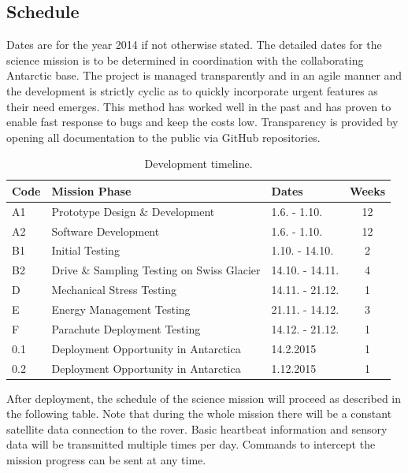 \documentclass[a4paper,12pt]{article}
\begin{document}
\subsection{Schedule}

Dates are for the year 2014 if not otherwise stated. The detailed dates for the science mission is to be determined in coordination with the collaborating Antarctic base. The project is managed transparently and in an agile manner and the development is strictly cyclic as to quickly incorporate urgent features as their need emerges. This method has worked well in the past and has proven to enable fast response to bugs and keep the costs low. Transparency is provided by opening all documentation to the public via GitHub \cite{octanisgithub} repositories. 

\begin{table}[h!]
\centering
\begin{tabular}{ l | l | l | c }

\bfseries{Code} & \bfseries{Mission Phase} & \bfseries{Dates} & \bfseries{Weeks} \\
\hline
A1 & Prototype Design \& Development & 1.6. - 1.10. & 12 \\
A2 & Software Development & 1.6. - 1.10. & 12 \\
B1 & Initial Testing & 1.10. - 14.10. & 2  \\
B2 & Drive \& Sampling Testing on Swiss Glacier & 14.10. - 14.11. & 4 \\
D & Mechanical Stress Testing & 14.11. - 21.12. & 1 \\
E & Energy Management Testing & 21.11. - 14.12. & 3 \\
F & Parachute Deployment Testing & 14.12. - 21.12. & 1 \\
0.1 & Deployment Opportunity in Antarctica & 14.2.2015 &  1 \\
0.2 & Deployment Opportunity in Antarctica & 1.12.2015 &  1 \\

\end{tabular}
\caption{Development timeline.}
\end{table}

After deployment, the schedule of the science mission will proceed as described in the following table. Note that during the whole mission there will be a constant satellite data connection to the rover. Basic heartbeat information and sensory data will be transmitted multiple times per day. Commands to intercept the mission progress can be sent at any time.
\end{document}
